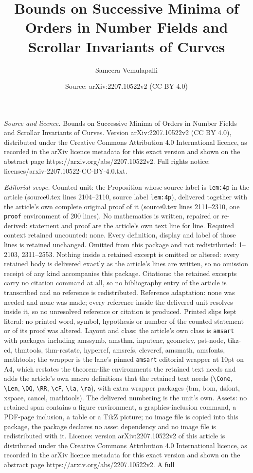 \documentclass[10pt,a4paper]{amsart}
\title[Bounds on Successive Minima of Orders in Number Fields and S]{Bounds on Successive Minima of Orders in Number Fields and Scrollar Invariants of Curves}
\author{Sameera Vemulapalli}
\date{Source: arXiv:2207.10522v2 (CC BY 4.0)}
\begin{document}
\maketitle

\noindent\emph{Source and licence.} Bounds on Successive Minima of Orders in Number Fields and Scrollar Invariants of Curves. Version arXiv:2207.10522v2 (CC BY 4.0), distributed under the Creative Commons Attribution 4.0 International licence, as recorded in the arXiv licence metadata for this exact version and shown on the abstract page https://arxiv.org/abs/2207.10522v2. Full rights notice: licenses/arxiv-2207.10522-CC-BY-4.0.txt.\par\smallskip

\noindent\textit{Editorial scope.} Counted unit: the Proposition whose source label is \texttt{lem:4p} in the article (source0.tex lines 2104--2110, source label \texttt{lem:4p}), delivered together with the article's own complete original proof of it (source0.tex lines 2111--2310, one \texttt{proof} environment of 200 lines). No mathematics is written, repaired or re-derived: statement and proof are the article's own text line for line. Required context retained uncounted: none. Every definition, display and label of those lines is retained unchanged. Omitted from this package and not redistributed: 1--2103, 2311--2553. Nothing inside a retained excerpt is omitted or altered: every retained body is delivered exactly as the article's lines are written, so no omission receipt of any kind accompanies this package. Citations: the retained excerpts carry no citation command at all, so no bibliography entry of the article is transcribed and no reference is redistributed. Reference adaptation: none was needed and none was made; every reference inside the delivered unit resolves inside it, so no unresolved reference or citation is produced. Printed slips kept literal: no printed word, symbol, hypothesis or number of the counted statement or of its proof was altered. Layout and class: the article's own class is \texttt{amsart} with packages including amssymb, amsthm, inputenc, geometry, pst-node, tikz-cd, thmtools, thm-restate, hyperref, amsrefs, cleveref, amsmath, amsfonts, mathtools; the wrapper is the lane's pinned \texttt{amsart} editorial wrapper at 10pt on A4, which restates the theorem-like environments the retained text needs and adds the article's own macro definitions that the retained text needs (\texttt{\textbackslash Cone}, \texttt{\textbackslash Len}, \texttt{\textbackslash QQ}, \texttt{\textbackslash RR}, \texttt{\textbackslash cF}, \texttt{\textbackslash la}, \texttt{\textbackslash ra}), with extra wrapper packages (bm, bbm, dsfont, xspace, cancel, mathtools). The delivered numbering is the unit's own. Assets: no retained span contains a figure environment, a graphics-inclusion command, a PDF-page inclusion, a table or a TikZ picture; no image file is copied into this package, the package declares no asset dependency and no image file is redistributed with it. Licence: version arXiv:2207.10522v2 of this article is distributed under the Creative Commons Attribution 4.0 International licence, as recorded in the arXiv licence metadata for this exact version and shown on the abstract page https://arxiv.org/abs/2207.10522v2. A full 
\end{document}
